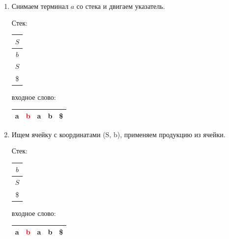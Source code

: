 \begin{example}
\begin{enumerate}
    \begin{center}
  \end{center}

\item Снимаем терминал $a$ со стека и двигаем указатель.

    Стек: \,
    \begin{tabular}[c]{ |c| }
        \\ \hline
        $S$ \\ \hline
        $b$ \\ \hline
        $S$ \\ \hline
        \$ \\ \hline
    \end{tabular}
    \qquad  \qquad \qquad  \qquad входное слово: \,
    \begin{tabular}[c]{ |c|c|c|c|c| }
        \hline
        a & \textcolor{red}{b} & a & b & \$ \\ \hline
    \end{tabular}

    \begin{center}
  \end{center}

\item Ищем ячейку с координатами (S, b), применяем продукцию из ячейки.

    Стек: \,
    \begin{tabular}[c]{ |c| }
        \\ \hline
        $b$ \\ \hline
        $S$ \\ \hline
        \$ \\ \hline
    \end{tabular}
    \qquad  \qquad \qquad  \qquad входное слово: \,
    \begin{tabular}[c]{ |c|c|c|c|c| }
        \hline
        a & \textcolor{red}{b} & a & b & \$ \\ \hline
    \end{tabular}


\end{enumerate}
\end{example}
